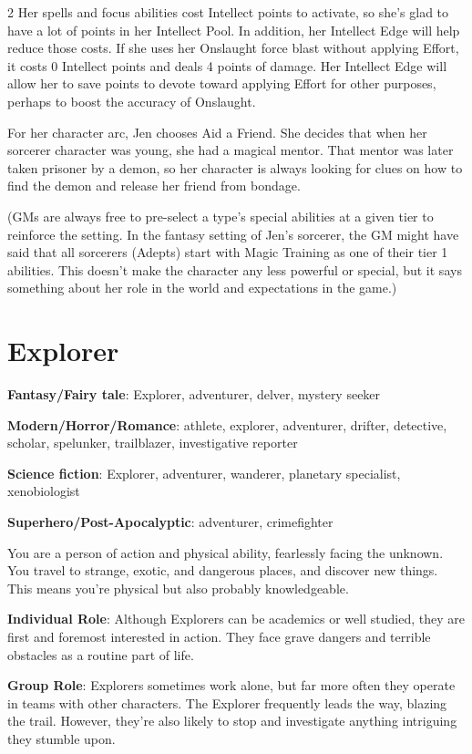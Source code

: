 \begin{multicols}{2}
Her spells and focus abilities cost Intellect points to activate, so she’s glad to have a lot of points in her Intellect Pool. In addition, her Intellect Edge will help reduce those costs. If she uses her Onslaught force blast without applying Effort, it costs 0 Intellect points and deals 4 points of damage. Her Intellect Edge will allow her to save points to devote toward applying Effort for other purposes, perhaps to boost the accuracy of Onslaught.

For her character arc, Jen chooses Aid a Friend. She decides that when her sorcerer character was young, she had a magical mentor. That mentor was later taken prisoner by a demon, so her character is always looking for clues on how to find the demon and release her friend from bondage.

(GMs are always free to pre-select a type’s special abilities at a given tier to reinforce the setting. In the fantasy setting of Jen’s sorcerer, the GM might have said that all sorcerers (Adepts) start with Magic Training as one of their tier 1 abilities. This doesn’t make the character any less powerful or special, but it says something about her role in the world and expectations in the game.)

\section{Explorer}

\textbf{Fantasy/Fairy tale}: Explorer, adventurer, delver, mystery seeker

\textbf{Modern/Horror/Romance}: athlete, explorer, adventurer, drifter, detective, scholar, spelunker, trailblazer, investigative reporter

\textbf{Science fiction}: Explorer, adventurer, wanderer, planetary specialist, xenobiologist

\textbf{Superhero/Post-Apocalyptic}: adventurer, crimefighter

You are a person of action and physical ability, fearlessly facing the unknown. You travel to strange, exotic, and dangerous places, and discover new things. This means you’re physical but also probably knowledgeable.

\textbf{Individual Role}: Although Explorers can be academics or well studied, they are first and foremost interested in action. They face grave dangers and terrible obstacles as a routine part of life. 

\textbf{Group Role}: Explorers sometimes work alone, but far more often they operate in teams with other characters. The Explorer frequently leads the way, blazing the trail. However, they’re also likely to stop and investigate anything intriguing they stumble upon. 


\end{multicols}
